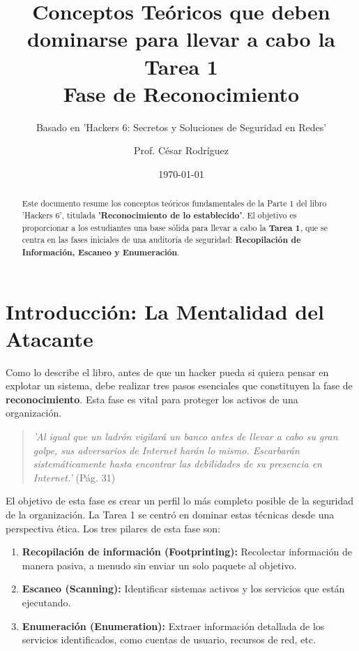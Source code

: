 \documentclass[12pt,a4paper]{article}
\title{Conceptos Teóricos que deben dominarse para llevar a cabo la Tarea 1 \\ \large{\textbf{Fase de Reconocimiento}}}
\author{Basado en 'Hackers 6: Secretos y Soluciones de Seguridad en Redes'}
\author{Prof. César Rodríguez}
\date{\today}
\begin{document}
\maketitle

\begin{abstract}
    Este documento resume los conceptos teóricos fundamentales de la Parte 1 del libro 'Hackers 6', titulada \textbf{'Reconocimiento de lo establecido'}. El objetivo es proporcionar a los estudiantes una base sólida para llevar a cabo la \textbf{Tarea 1}, que se centra en las fases iniciales de una auditoría de seguridad: \textbf{Recopilación de Información, Escaneo y Enumeración}.
\end{abstract}

\section{Introducción: La Mentalidad del Atacante}

Como lo describe el libro, antes de que un hacker pueda si quiera pensar en explotar un sistema, debe realizar tres pasos esenciales que constituyen la fase de \textbf{reconocimiento}. Esta fase es vital para proteger los activos de una organización.

\begin{quote}
    \textit{'Al igual que un ladrón vigilará un banco antes de llevar a cabo su gran golpe, sus adversarios de Internet harán lo mismo. Escarbarán sistemáticamente hasta encontrar las debilidades de su presencia en Internet.'} (Pág. 31)
\end{quote}

El objetivo de esta fase es crear un perfil lo más completo posible de la seguridad de la organización. La Tarea 1 se centró en dominar estas técnicas desde una perspectiva ética. Los tres pilares de esta fase son:

\begin{enumerate}
    \item \textbf{Recopilación de información (Footprinting):} Recolectar información de manera pasiva, a menudo sin enviar un solo paquete al objetivo.
    \item \textbf{Escaneo (Scanning):} Identificar sistemas activos y los servicios que están ejecutando.
    \item \textbf{Enumeración (Enumeration):} Extraer información detallada de los servicios identificados, como cuentas de usuario, recursos de red, etc.
\end{enumerate}
\end{document}

